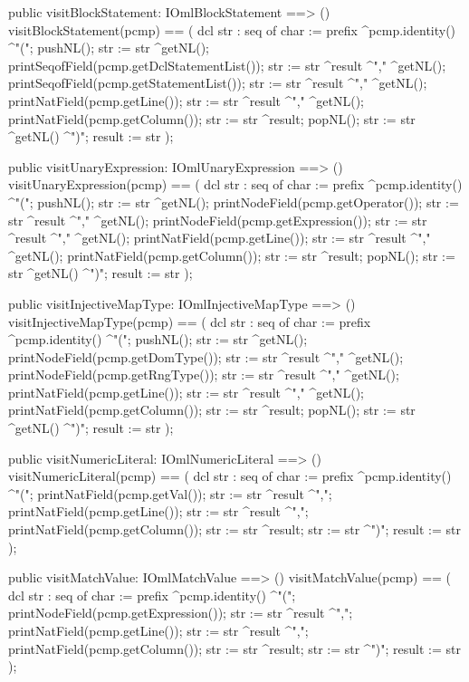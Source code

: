 \begin{vdm_al}
  public visitBlockStatement: IOmlBlockStatement ==> ()
  visitBlockStatement(pcmp) ==
    ( dcl str : seq of char := prefix ^pcmp.identity() ^"(";
      pushNL();
      str := str ^getNL();
      printSeqofField(pcmp.getDclStatementList());
      str := str ^result ^"," ^getNL();
      printSeqofField(pcmp.getStatementList());
      str := str ^result ^"," ^getNL();
      printNatField(pcmp.getLine());
      str := str ^result ^"," ^getNL();
      printNatField(pcmp.getColumn());
      str := str ^result;
      popNL();
      str := str ^getNL() ^")";
      result := str );

  public visitUnaryExpression: IOmlUnaryExpression ==> ()
  visitUnaryExpression(pcmp) ==
    ( dcl str : seq of char := prefix ^pcmp.identity() ^"(";
      pushNL();
      str := str ^getNL();
      printNodeField(pcmp.getOperator());
      str := str ^result ^"," ^getNL();
      printNodeField(pcmp.getExpression());
      str := str ^result ^"," ^getNL();
      printNatField(pcmp.getLine());
      str := str ^result ^"," ^getNL();
      printNatField(pcmp.getColumn());
      str := str ^result;
      popNL();
      str := str ^getNL() ^")";
      result := str );

  public visitInjectiveMapType: IOmlInjectiveMapType ==> ()
  visitInjectiveMapType(pcmp) ==
    ( dcl str : seq of char := prefix ^pcmp.identity() ^"(";
      pushNL();
      str := str ^getNL();
      printNodeField(pcmp.getDomType());
      str := str ^result ^"," ^getNL();
      printNodeField(pcmp.getRngType());
      str := str ^result ^"," ^getNL();
      printNatField(pcmp.getLine());
      str := str ^result ^"," ^getNL();
      printNatField(pcmp.getColumn());
      str := str ^result;
      popNL();
      str := str ^getNL() ^")";
      result := str );

  public visitNumericLiteral: IOmlNumericLiteral ==> ()
  visitNumericLiteral(pcmp) ==
    ( dcl str : seq of char := prefix ^pcmp.identity() ^"(";
      printNatField(pcmp.getVal());
      str := str ^result ^",";
      printNatField(pcmp.getLine());
      str := str ^result ^",";
      printNatField(pcmp.getColumn());
      str := str ^result;
      str := str ^")";
      result := str );

  public visitMatchValue: IOmlMatchValue ==> ()
  visitMatchValue(pcmp) ==
    ( dcl str : seq of char := prefix ^pcmp.identity() ^"(";
      printNodeField(pcmp.getExpression());
      str := str ^result ^",";
      printNatField(pcmp.getLine());
      str := str ^result ^",";
      printNatField(pcmp.getColumn());
      str := str ^result;
      str := str ^")";
      result := str );


\end{vdm_al}
